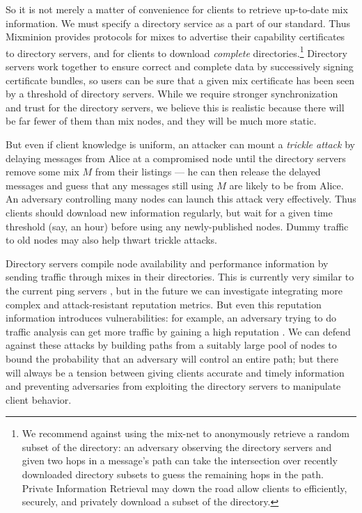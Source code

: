 \documentclass[11pt]{IEEEtran}
\begin{document}
So it is not merely a matter of convenience for clients to retrieve
up-to-date mix information.
We must specify a directory
service as a part of our standard. Thus Mixminion provides protocols for
mixes to advertise their capability certificates to directory servers,
and for clients to download \emph{complete} directories.\footnote{
  We recommend against using the mix-net to anonymously retrieve a random
  subset of the directory: an adversary observing the directory servers
  and given two hops in a message's path can take the intersection over
  recently downloaded directory subsets to guess the remaining hops in
  the path. Private Information Retrieval \cite{malkin-thesis} may down
  the road allow clients to efficiently, securely, and privately download
  a subset of the directory.
}
Directory servers work together to ensure correct and complete data by
successively signing certificate bundles, so users can be sure that a
given mix certificate has been seen by a threshold of directory servers.
While we require stronger synchronization and trust for the directory
servers, we believe this is realistic because there will be far fewer
of them than mix nodes, and they will be much more static.

But even if client knowledge is uniform, an attacker can mount a
\emph{trickle attack} by delaying messages from Alice at a compromised
node until the directory servers remove some mix $M$ from their listings
--- he can then release the delayed messages and guess that any messages
still using $M$ are likely to be from Alice. An adversary controlling
many nodes can launch this attack very effectively. Thus clients
should download new information regularly,
but wait for a given time threshold (say, an hour) before using any
newly-published nodes. Dummy traffic to old nodes may also 
help thwart trickle attacks.

Directory servers compile node availability and performance information by
sending traffic through mixes in their directories. This is currently
very similar to the current ping servers \cite{levien}, but in the
future we can investigate integrating more complex and attack-resistant
reputation metrics.  But even this reputation information introduces
vulnerabilities: for example, an adversary 
trying to do traffic analysis
can get more traffic by gaining a high reputation \cite{mix-acc}. We can
defend against these attacks by building paths from a suitably large pool
of nodes \cite{casc-rep} to bound the probability that an adversary will
control an entire path; but there will always be a tension between giving
clients accurate and timely information and preventing adversaries from
exploiting the directory servers to manipulate client behavior.
\end{document}
